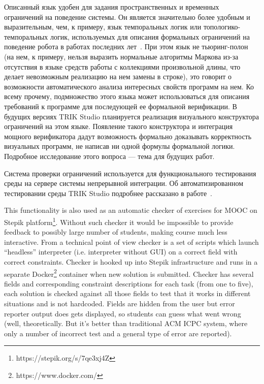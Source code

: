 \documentclass[conference]{IEEEtran}
\begin{document}
Описанный язык удобен для задания пространственных и временных ограничений на поведение системы. Он является значительно более удобным и выразительным, чем, к примеру, язык темпоральных логик или топологико-темпоральных логик, используемых для описания формальных ограничений на поведение робота в работах последних лет~\cite{mordvinov2016formal,kress2007s,бугайченко2007разработка,дмитриев2013адаптация}. При этом язык не тьюринг-полон (на нем, к примеру, нельзя выразить нормальные алгоритмы Маркова из-за отсутствия в языке средств работы с коллекциями произвольной длины, что делает невозможным реализацию на нем замены в строке), это говорит о возможности автоматического анализа интересных свойств программ на нем. Ко всему прочему, подмножество этого языка может использоваться для описания требований к программе для последующей ее формальной верификации. В будущих версиях TRIK Studio планируется реализация визуального конструктора ограничений на этом языке. Появление такого конструктора и интеграция мощного верификатора дадут возможность формально доказывать корректность визуальных программ, не написав ни одной формулы формальной логики. Подробное исследование этого вопроса --- тема для будущих работ.

Система проверки ограничений используется для функционального тестирования среды на сервере системы непрерывной интеграции. Об автоматизированном тестировании среды TRIK Studio подробнее рассказано в работе~\cite{mordvinov2016testing}.

This functionality is also used as an automatic checker of exercises for MOOC on Stepik platform\footnote{https://stepik.org/s/7qe3xj4Z}. Without such checker it would be impossible to provide feedback to possibly large number of students, making course much less interactive. From a technical point of view checker is a set of scripts which launch "`headless"' interpreter (i.e. interpreter without GUI) on a correct field with correct constraints. Checker is hooked up into Stepik infrastructure and runs in a separate Docker\footnote{https://www.docker.com/} container when new solution is submitted. Checker has several fields and corresponding constraint descriptions for each task (from one to five), each solution is checked against all those fields to test that it works in different situations and is not hardcoded. Fields are hidden from the user but error reporter output does gets displayed, so students can guess what went wrong (well, theoretically. But it's better than traditional ACM ICPC system, where only a number of incorrect test and a general type of error are reported).
\end{document}
